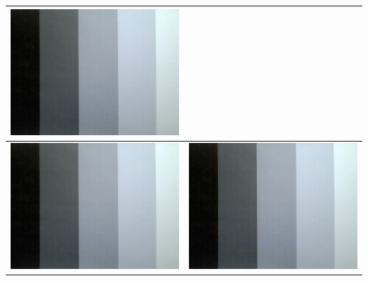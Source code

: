 \begin{tabular}{|c|c|}
\includegraphics[scale=0.25]{media/grauwertkeil.png}
 \\ 
\hline 
\includegraphics[scale=0.25]{media/grauwertkeil.png}
 & 
\includegraphics[scale=0.25]{media/grauwertkeil.png}

\end{tabular}
